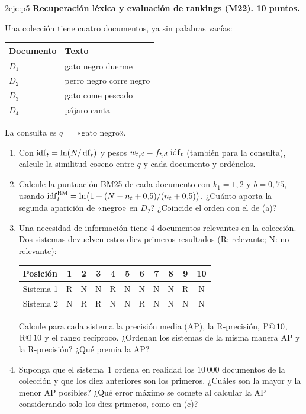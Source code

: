 \begin{ejercicio}{2}{eje:p5}
\textbf{Recuperación léxica y evaluación de rankings (M22). 10 puntos.}

Una colección tiene cuatro documentos, ya sin palabras vacías:
\begin{center}
\begin{tabular}{@{}ll@{}}
\toprule
Documento & Texto \\
\midrule
$D_1$ & gato negro duerme \\
$D_2$ & perro negro corre negro \\
$D_3$ & gato come pescado \\
$D_4$ & pájaro canta \\
\bottomrule
\end{tabular}
\end{center}
La consulta es $q=$ «gato negro».
\begin{enumerate}[label=(\alph*)]
  \item {} Con $\operatorname{idf}_t=\ln(N/\operatorname{df}_t)$ y pesos $w_{t,d}=f_{t,d}\,\operatorname{idf}_t$ (también para la consulta), calcule la similitud coseno entre $q$ y cada documento y ordénelos.
  \item {} Calcule la puntuación BM25 de cada documento con $k_1=1{,}2$ y $b=0{,}75$, usando $\operatorname{idf}^{\mathrm{BM}}_t=\ln\bigl(1+(N-n_t+0{,}5)/(n_t+0{,}5)\bigr)$. ¿Cuánto aporta la segunda aparición de «negro» en $D_2$? ¿Coincide el orden con el de (a)?
  \item {} Una necesidad de información tiene 4 documentos relevantes en la colección. Dos sistemas devuelven estos diez primeros resultados (R: relevante; N: no relevante):
  \begin{center}
  \begin{tabular}{@{}l*{10}{c}@{}}
  \toprule
  Posición & 1 & 2 & 3 & 4 & 5 & 6 & 7 & 8 & 9 & 10 \\
  \midrule
  Sistema 1 & R & N & N & R & N & N & N & N & R & N \\
  Sistema 2 & N & R & R & N & N & R & N & N & N & N \\
  \bottomrule
  \end{tabular}
  \end{center}
  Calcule para cada sistema la precisión media (AP), la R-precisión, $\operatorname{P@}10$, $\operatorname{R@}10$ y el rango recíproco. ¿Ordenan los sistemas de la misma manera AP y la R-precisión? ¿Qué premia la AP?
  \item {} Suponga que el sistema~1 ordena en realidad los $10\,000$ documentos de la colección y que los diez anteriores son los primeros. ¿Cuáles son la mayor y la menor AP posibles? ¿Qué error máximo se comete al calcular la AP considerando solo los diez primeros, como en (c)?
\end{enumerate}
\end{ejercicio}

